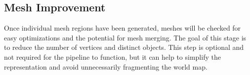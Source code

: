 \subsection{Mesh Improvement}
Once individual mesh regions have been generated, meshes will be checked for easy optimizations and the potential for mesh merging. The goal of this stage is to reduce the number of vertices and distinct objects. This step is optional and not required for the pipeline to function, but it can help to simplify the representation and avoid unnecessarily fragmenting the world map. 
